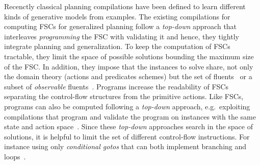 Recenctly classical planning compilations have been defined to learn different kinds of generative models from examples. The existing compilations for computing FSCs for generalized planning follow a {\it top-down} approach that interleaves {\it programming} the FSC with validating it and hence, they tightly integrate planning and generalization. To keep the computation of FSCs tractable, they limit the space of possible solutions bounding the maximum size of the FSC. In addition, they impose that the instances to solve share, not only the domain theory (actions and predicates schemes) but the set of fluents~\cite{javi-Gplanning-ICAPS16} or a subset of {\it observable} fluents~\cite{Geffner:FSM:AAAI10}. Programs increase the readability of FSCs separating the control-flow structures from the primitive actions. Like FSCs, programs can also be computed following a {\it top-down} approach, e.g.~exploiting compilations that program and validate the program on instances with the same state and action space~\cite{javi-Gplanning-ICAPS16}. Since these {\it top-down} approaches search in the space of solutions, it is helpful to limit the set of different control-flow instructions. For instance using only {\it conditional gotos} that can both implement branching and loops~\cite{Jimenez15}. 